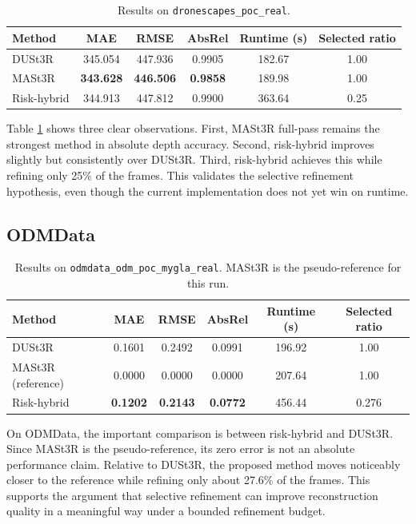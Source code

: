 \documentclass[preprint,12pt]{elsarticle}
\begin{document}
\begin{table}[t]
\centering
\small
\begin{tabular}{lccccc}
\toprule
Method & MAE & RMSE & AbsRel & Runtime (s) & Selected ratio \\
\midrule
DUSt3R & 345.054 & 447.936 & 0.9905 & 182.67 & 1.00 \\
MASt3R & \textbf{343.628} & \textbf{446.506} & \textbf{0.9858} & 189.98 & 1.00 \\
Risk-hybrid & 344.913 & 447.812 & 0.9900 & 363.64 & 0.25 \\
\bottomrule
\end{tabular}
\caption{Results on \texttt{dronescapes\_poc\_real}.}
\label{tab:dronescapes}
\end{table}

Table \ref{tab:dronescapes} shows three clear observations. First, MASt3R full-pass remains the strongest method in absolute depth accuracy. Second, risk-hybrid improves slightly but consistently over DUSt3R. Third, risk-hybrid achieves this while refining only 25\% of the frames. This validates the selective refinement hypothesis, even though the current implementation does not yet win on runtime.

\subsection{ODMData}

\begin{table}[t]
\centering
\small
\begin{tabular}{lccccc}
\toprule
Method & MAE & RMSE & AbsRel & Runtime (s) & Selected ratio \\
\midrule
DUSt3R & 0.1601 & 0.2492 & 0.0991 & 196.92 & 1.00 \\
MASt3R (reference) & 0.0000 & 0.0000 & 0.0000 & 207.64 & 1.00 \\
Risk-hybrid & \textbf{0.1202} & \textbf{0.2143} & \textbf{0.0772} & 456.44 & 0.276 \\
\bottomrule
\end{tabular}
\caption{Results on \texttt{odmdata\_odm\_poc\_mygla\_real}. MASt3R is the pseudo-reference for this run.}
\label{tab:odm}
\end{table}

On ODMData, the important comparison is between risk-hybrid and DUSt3R. Since MASt3R is the pseudo-reference, its zero error is not an absolute performance claim. Relative to DUSt3R, the proposed method moves noticeably closer to the reference while refining only about 27.6\% of the frames. This supports the argument that selective refinement can improve reconstruction quality in a meaningful way under a bounded refinement budget.
\end{document}
